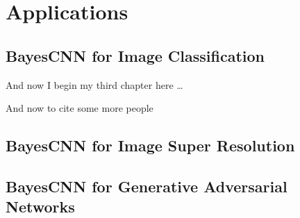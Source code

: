 \chapter{Applications}


\section{BayesCNN for Image Classification}
And now I begin my third chapter here \dots

And now to cite some more people~\citet{Rea85,Ancey1996}

\section{BayesCNN for Image Super Resolution}

\section{BayesCNN for Generative Adversarial Networks}